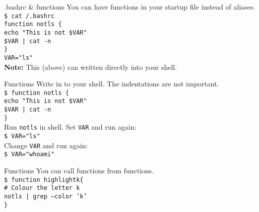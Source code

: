 \documentclass{beamer}
\let\tt\texttt
\let\bf\textbf
\let\tilde\texttildelow
\begin{document}
\begin{frame}{.bashrc \& functions}
        You can have functions in your startup file instead of aliases. \\
        \tt{\$ cat {\tilde}/.bashrc}    \\
        \tt{function notls \{ }         \\
        \quad \tt{echo "This is not \$VAR"} \\
        \quad \tt{\$VAR | cat -n }      \\
        \tt{\} }                        \\
        \tt{VAR="ls"}                   \\
        \bf{Note:} This (above) can written directly into your shell. \\
\end{frame}

\begin{frame}{Functions}
        Write in to your shell. The indentations are not important. \\
        \tt{\$ function notls \{ }         \\
        \quad \tt{echo "This is not \$VAR"} \\
        \quad \tt{\$VAR | cat -n }      \\
        \tt{\} }                        \\
        Run \tt{notls} in shell. Set \tt{VAR} and run again: \\
        \tt{\$ VAR="ls"}                   \\
        Change \tt{VAR} and run again:     \\
        \tt{\$ VAR="whoami"}               \\
\end{frame}

\begin{frame}{Functions}
        You can call functions from functions.  \\
        \tt{\$ function highlightk\{ }        \\
        \quad \tt{\# Colour the letter k }           \\
        \quad \tt{notls | grep --color 'k'}     \\
        \tt{\} }                        \\
\end{frame}
\end{document}
